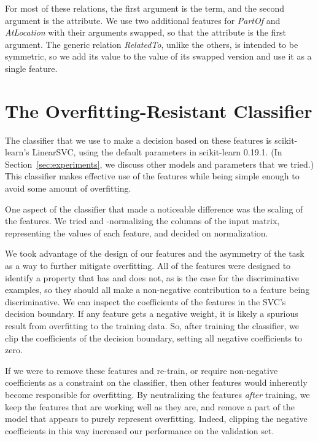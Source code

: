 \documentclass[11pt,a4paper]{article}
\begin{document}
For most of these relations, the first argument is the term, and the second
argument is the attribute. We use two additional features for \emph{PartOf} and
\emph{AtLocation} with their arguments swapped, so that the attribute is the
first argument. The generic relation \emph{RelatedTo}, unlike the others, is
intended to be symmetric, so we add its value to the value of its swapped
version and use it as a single feature.

\section{The Overfitting-Resistant Classifier}

The classifier that we use to make a decision based on these features is
scikit-learn's LinearSVC, using the default parameters in scikit-learn 0.19.1.
(In Section~\ref{sec:experiments}, we discuss other models and parameters that
we tried.) This classifier makes effective use of the features while being
simple enough to avoid some amount of overfitting.

One aspect of the classifier that made a noticeable difference was the
scaling of the features. We tried  and -normalizing the columns of
the input matrix, representing the values of each feature, and decided on
 normalization.

We took advantage of the design of our features and the asymmetry of the task
as a way to further mitigate overfitting. All of the features were designed to
identify a property that \termOne{} has and \termTwo{} does not, as is the case
for the discriminative examples, so they should all make a non-negative
contribution to a feature being discriminative. We can inspect the coefficients
of the features in the SVC's decision boundary. If any feature gets a negative
weight, it is likely a spurious result from overfitting to the training data.
So, after training the classifier, we clip the coefficients of the decision
boundary, setting all negative coefficients to zero.

If we were to remove these features and re-train, or require non-negative
coefficients as a constraint on the classifier, then other features would
inherently become responsible for overfitting. By neutralizing the features
\emph{after} training, we keep the features that are working well as they are,
and remove a part of the model that appears to purely represent overfitting.
Indeed, clipping the negative coefficients in this way increased our
performance on the validation set.
\end{document}
